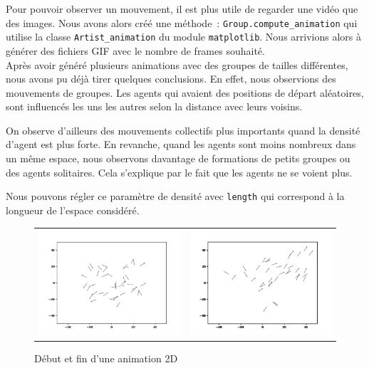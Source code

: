 \documentclass[french, a4paper, 12pt, openany]{report}
\begin{document}
   Pour pouvoir observer un mouvement, il est plus utile de regarder une vidéo que des images. Nous avons alors créé une méthode~: \verb|Group.compute_animation| qui utilise la classe \verb|Artist_animation| du module \verb|matplotlib|. Nous arrivions alors à générer des fichiers GIF avec le nombre de frames souhaité.\\
   
   Après avoir généré plusieurs animations avec des groupes de tailles différentes, nous avons pu déjà tirer quelques conclusions. En effet, nous observions des mouvements de groupes. Les agents qui avaient des positions de départ aléatoires, sont influencés les uns les autres selon la distance avec leurs voisins.
   
   On observe d'ailleurs des mouvements collectifs plus importants quand la densité d'agent est plus forte. En revanche, quand les agents sont moins nombreux dans un même espace, nous observons davantage de formations de petits groupes ou des agents solitaires. Cela s'explique par le fait que les agents ne se voient plus.
   
   Nous pouvons régler ce paramètre de densité avec \verb|length| qui correspond à la longueur de l'espace considéré.
	\begin{figure}[!h]
		\centering
		\begin{tabular}{cc}
			\includegraphics[width=8cm]{images/image_3.png} & \includegraphics[width=8cm]{images/image_4.png} \\
		\end{tabular}
		\caption{Début et fin d'une animation 2D}
	\end{figure} 
\end{document}
